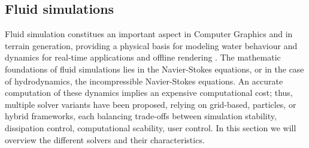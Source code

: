 
\subsection{Fluid simulations}

Fluid simulation constitues an important aspect in Computer Graphics and in terrain generation, providing a physical basis for modeling water behaviour and dynamics for real-time applications and offline rendering \cite{Wang2024}. The mathematic foundations of fluid simulations lies in the Navier-Stokes equations, or in the case of hydrodynamics, the incompressible Navier-Stokes equations. An accurate computation of these dynamics implies an expensive computational cost; thus, multiple solver variants have been proposed, relying on grid-based, particles, or hybrid frameworks, each balancing trade-offs between simulation stability, dissipation control, computational scability, user control. In this section we will overview the different solvers and their characteristics.




